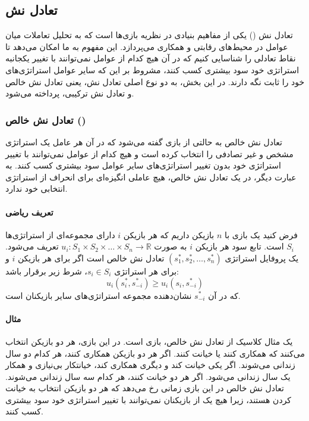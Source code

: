 \subsection{تعادل نش}
تعادل نش () یکی از مفاهیم بنیادی در نظریه بازی‌ها است که به تحلیل تعاملات میان عوامل در محیط‌های رقابتی و همکاری می‌پردازد. این مفهوم به ما امکان می‌دهد تا نقاط تعادلی را شناسایی کنیم که در آن هیچ کدام از عوامل نمی‌توانند با تغییر یکجانبه استراتژی خود سود بیشتری کسب کنند، مشروط بر این که سایر عوامل استراتژی‌های خود را ثابت نگه دارند. در این بخش، به دو نوع اصلی تعادل نش، یعنی تعادل نش خالص و تعادل نش ترکیبی، پرداخته می‌شود.

\subsubsection{تعادل نش خالص ()}
تعادل نش خالص به حالتی از بازی گفته می‌شود که در آن هر عامل یک استراتژی مشخص و غیر تصادفی را انتخاب کرده است و هیچ کدام از عوامل نمی‌توانند با تغییر استراتژی خود بدون تغییر استراتژی‌های سایر عوامل سود بیشتری کسب کنند. به عبارت دیگر، در یک تعادل نش خالص، هیچ عاملی انگیزه‌ای برای انحراف از استراتژی انتخابی خود ندارد.

\paragraph{تعریف ریاضی}
فرض کنید یک بازی با \( n \) بازیکن داریم که هر بازیکن \( i \) دارای مجموعه‌ای از استراتژی‌ها \( S_i \) است. تابع سود هر بازیکن \( i \) به صورت \( u_i: S_1 \times S_2 \times \dots \times S_n \rightarrow \mathbb{R} \) تعریف می‌شود. یک پروفایل استراتژی \( (s_1^*, s_2^*, \dots, s_n^*) \) تعادل نش خالص است اگر برای هر بازیکن \( i \) و برای هر استراتژی \( s_i \in S_i \)، شرط زیر برقرار باشد:
\[
u_i(s_i^*, s_{-i}^*) \geq u_i(s_i, s_{-i}^*)
\]
که در آن \( s_{-i}^* \) نشان‌دهنده مجموعه استراتژی‌های سایر بازیکنان است.

\paragraph{مثال}
یک مثال کلاسیک از تعادل نش خالص، بازی  است. در این بازی، هر دو بازیکن انتخاب می‌کنند که همکاری کنند یا خیانت کنند. اگر هر دو بازیکن همکاری کنند، هر کدام دو سال زندانی می‌شوند. اگر یکی خیانت کند و دیگری همکاری کند، خیانتکار بی‌نیازی و همکار یک سال زندانی می‌شود. اگر هر دو خیانت کنند، هر کدام سه سال زندانی می‌شوند. تعادل نش خالص در این بازی زمانی رخ می‌دهد که هر دو بازیکن انتخاب به خیانت کردن هستند، زیرا هیچ یک از بازیکنان نمی‌توانند با تغییر استراتژی خود سود بیشتری کسب کنند.

